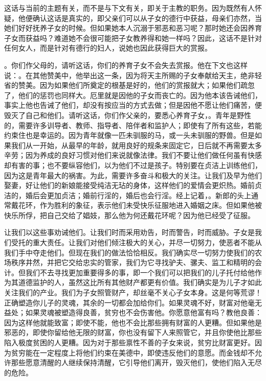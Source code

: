 这话与当前的主题有关，而不是与下文有关，即关于主教的职务。因为既然有人怀疑，他便确认这话是真实的，即父亲们可以从子女的德行中获益，母亲们亦然，当她们好好抚养子女的时候。但如果她本人沉溺于邪恶和恶习呢？那时她还会因养育子女而获益吗？难道她不会很可能把子女教养得和她一样吗？因此，这话不是针对任何女人，而是针对有德行的妇人，说她也因此获得巨大的赏报。\par

。你们作父母的，请听这话，你们的养育子女不会失去赏报。他在下文也这样说：。在其他赞美中，他举出这一条，因为将天主所赐的子女奉献给天主，绝非轻省的赞美。因为如果他们所奠定的根基是好的，他们的赏报就大；如果他们疏忽了，他们的惩罚也同样大。厄里就是因他的子女而丧亡的。因为他本该告诫他们，事实上他也告诫了他们，却没有按应当的方式去做；但是因他不愿让他们痛苦，便毁灭了自己和他们。请听这话，你们作父亲的，要悉心养育子女，。青年是野性的，需要许多训导者、教师、指导者、陪伴者和监护人；即使有了所有这些，若能约束住也是幸运的。因为青年就像一匹未驯服的马，或一头未驯服的野兽。但是如果我们从一开始，从最早的年龄，就用良好的规条来固定它，日后就不再需要太多辛劳；因为养成的良好习惯对他们来说就像法律。我们不要让他们做任何虽有快感却有害的事；也不要纵容他们，以为他们不过是孩子。特别要在贞洁上训练他们，因为这是青年最大的祸害。为此，需要许多奋斗和极大的关注。让我们及早为他们娶妻，好让他们的新娘能接受纯洁无玷的身体，这样他们的爱情会更炽热。婚前贞洁的，婚后会更加贞洁；婚前行淫的，婚后也会行淫。经上记着，。新郎的头上通常戴花环，作为胜利的象征，表示他们未受快乐征服地进入婚姻之床。但如果他被快乐所俘，把自己交给了娼妓，那么他为何还戴花环呢？因为他已经受了征服。\par

让我们以这些事劝诫他们。让我们时而采用劝告，时而警告，时而威胁。子女是我们受托的重大责任。让我们对他们倾注极大的关心，并尽一切努力，使恶者不能从我们手中夺走他们。但现在我们的做法恰恰相反。我们确实尽一切努力使我们的农场秩序井然，并把它交给忠实的管家，我们为它寻找驴夫、骡夫、监工和精明的会计。但我们不去寻找更加重要得多的事，即一个我们可以把我们的儿子托付给他作为其道德监护的人，虽然这比所有其他财产都更有价值。我们确实是为儿子才如此关注我们的产业。我们为子女照管财产，却丝毫不关心子女本身。这是何等荒谬！正确塑造你儿子的灵魂，其余的一切都会加给你们。如果灵魂不好，财富对他毫无益处；如果灵魂被塑造得良善，贫穷也不会伤害他。你愿意他富有吗？教他良善：因为这样他就能致富；即使不能，他也不会比那些拥有财富的人更糟。但如果他是邪恶的，即使你留给他无限的财富，你也没有留下人来照管它，并且你使他比那些陷入极度贫困的人更糟。因为对于那些禀性不善的子女来说，贫穷比财富更好。因为贫穷能在一定程度上将他们约束在美德中，即使违反他们的意愿。而金钱却不允许那些愿意清醒的人继续保持清醒，它引导他们离开，毁灭他们，使他们陷入无尽的危险。\par

